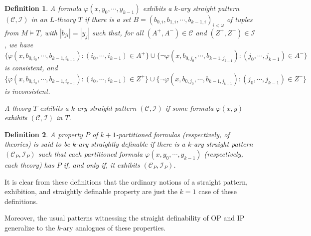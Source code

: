 \documentclass[10pt,a4paper]{amsart}
\newcommand{\calC}{\mathcal{C}}
\newcommand{\calI}{\mathcal{I}}
\newcommand{\vphi}{\varphi}
\newtheorem{definition}{Definition}
\begin{document}
\begin{definition}\label{k-ary exhibits definition}
    A formula $\vphi(x,y_0,\dotsm, y_{k-1})$ \textit{exhibits} a $k$-ary straight pattern $(\calC,\calI)$ in an $L$-theory $T$ if there is a set $B=(b_{0,i},b_{1,i},\dotsm, b_{k-1,i})_{i<\omega}$ of tuples from $M\models T$, with $|b_{ji}|=|y_j|$ such that, for all $(A^+,A^-)\in \calC$ and $(Z^+,Z^-)\in \calI$, we have \[\{\vphi(x,b_{0,i_0},\dotsm, b_{k-1,i_{k-1}})\colon (i_0,\dotsm, i_{k-1})\in A^+\}\cup \{\neg\vphi(x,b_{0,j_0},\dotsm, b_{k-1,j_{k-1}})\colon (j_0,\dotsm, j_{k-1})\in A^-\}\] is consistent, and \[\{\vphi(x,b_{0,i_0},\dotsm, b_{k-1,i_{k-1}})\colon (i_0,\dotsm, i_{k-1})\in Z^+\}\cup \{\neg\vphi(x,b_{0,j_0},\dotsm, b_{k-1,j_{k-1}})\colon (j_0,\dotsm, j_{k-1})\in Z^-\}\] is inconsistent.

     A theory $T$ \textit{exhibits} a $k$-ary straight pattern $(\mathcal{C}, \mathcal{I})$ if some formula $\varphi(x, y)$ exhibits $(\mathcal{C}, \mathcal{I})$ in $T$.
\end{definition}

\begin{definition}\label{k-ary straightly definable property}
    A property $P$ of $k+1$-partitioned formulas (respectively, of theories) is said to be \textit{$k$-ary straightly definable} if there is a $k$-ary straight pattern $(\calC_P,\calI_P)$ such that each partitioned formula $\vphi(x,y_0,\dotsm, y_{k-1})$ (respectively, each theory) has $P$ if, and only if, %
    it exhibits $(\calC_P,\calI_P)$.
\end{definition}

It is clear from these definitions that the ordinary notions of a straight pattern, exhibition, and straightly definable property are just the $k=1$ case of these definitions. 

Moreover, the usual patterns witnessing the straight definability of OP and IP generalize to the $k$-ary analogues of these properties.
\end{document}
